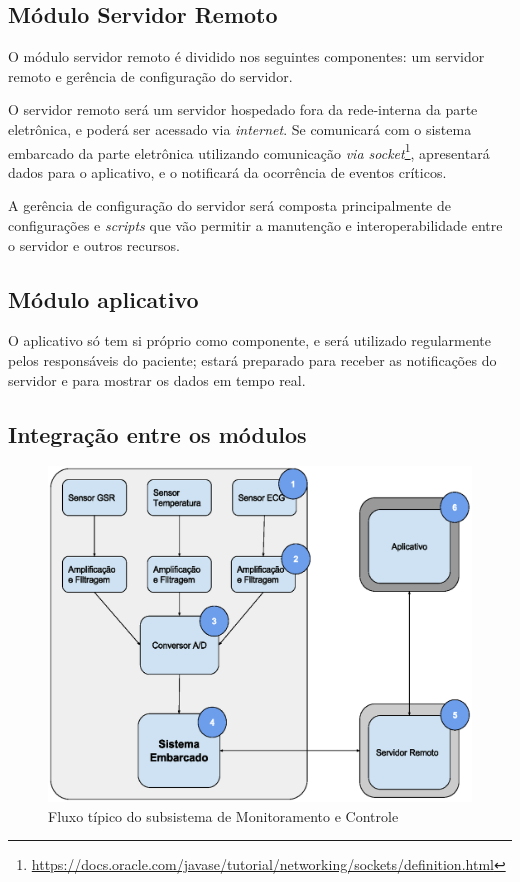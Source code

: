 \subsection{Módulo Servidor Remoto}
O módulo servidor remoto é dividido nos seguintes componentes: um servidor remoto
e gerência de configuração do servidor.

O servidor remoto será um servidor hospedado fora da rede-interna da parte
eletrônica, e poderá ser acessado via \textit{internet}. Se comunicará com
o sistema embarcado da parte eletrônica utilizando comunicação
\textit{via socket}\footnote{\url{https://docs.oracle.com/javase/tutorial/networking/sockets/definition.html}},
apresentará dados para o aplicativo, e o notificará da ocorrência de eventos
críticos.

A gerência de configuração do servidor será composta principalmente de
configurações e \textit{scripts} que vão permitir a manutenção e
interoperabilidade entre o servidor e outros recursos.

\subsection{Módulo aplicativo}

O aplicativo só tem si próprio como componente, e será utilizado regularmente
pelos responsáveis do paciente; estará preparado para receber as notificações
do servidor e para mostrar os dados em tempo real.

\subsection{Integração entre os módulos}

\begin{figure}[H]
  \centering
    \includegraphics[width=\textwidth]{figuras/arquitetura-monitoramentoecontrole.eps}
  \caption{Fluxo típico do subsistema de Monitoramento e Controle}
  \label{fig:arquitetura-monitoramento-e-controle}
\end{figure}

